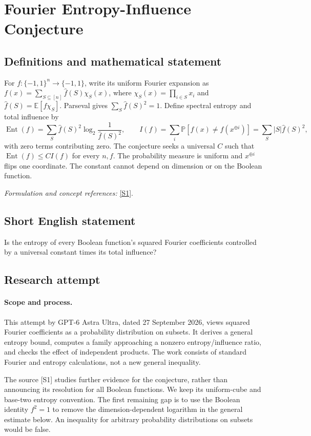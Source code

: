 \documentclass[11pt]{article}
\begin{document}
\section*{\texorpdfstring{Fourier Entropy-Influence Conjecture}{Fourier Entropy-Influence Conjecture}}\label{30006914}
\subsection{Definitions and mathematical statement}
For $f:\{-1,1\}^n\to\{-1,1\}$, write its uniform Fourier expansion as $f(x)=\sum_{S\subseteq[n]}\widehat f(S)\chi_S(x)$, where $\chi_S(x)=\prod_{i\in S}x_i$ and $\widehat f(S)={\mathbb{E}}[f\chi_S]$. Parseval gives $\sum_S\widehat f(S)^2=1$. Define spectral entropy and total influence by
\[
 \operatorname{Ent}(f)=\sum_S\widehat f(S)^2
 \log_2\frac1{\widehat f(S)^2},\qquad
 I(f)=\sum_i{\mathbb{P}}[f(x)\ne f(x^{\oplus i})]
 =\sum_S|S|\widehat f(S)^2,
\]
with zero terms contributing zero. The conjecture seeks a universal $C$ such that $\operatorname{Ent}(f)\le C I(f)$ for every $n,f$. The probability measure is uniform and $x^{\oplus i}$ flips one coordinate. The constant cannot depend on dimension or on the Boolean function.
\par\smallskip\textit{Formulation and concept references:} \href{https://arxiv.org/abs/2606.00246}{[S1]}.

\subsection{Short English statement}
Is the entropy of every Boolean function's squared Fourier coefficients controlled by a universal constant times its total influence?
\subsection{Research attempt}
\paragraph{Scope and process.}
This attempt by GPT-6 Astra Ultra, dated 27 September 2026, views squared Fourier coefficients as a probability distribution on subsets. It derives a general entropy bound, computes a family approaching a nonzero entropy/influence ratio, and checks the effect of independent products. The work consists of standard Fourier and entropy calculations, not a new general inequality.

The source [S1] studies further evidence for the conjecture, rather than announcing its resolution for all Boolean functions. We keep its uniform-cube and base-two entropy convention. The first remaining gap is to use the Boolean identity $f^2=1$ to remove the dimension-dependent logarithm in the general estimate below. An inequality for arbitrary probability distributions on subsets would be false.
\end{document}
